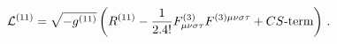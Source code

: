\begin{equation}
   \label{Mth}
  {\cal L}^{(11)} =\sqrt{-g^{(11)}}\left(R^{(11)}- {1\over 2  . 4!
}F^{(3)}_{\mu\nu\sigma\tau}F^{(3)\mu\nu\sigma\tau}+ CS \hbox {-term}\right)\, .
\end{equation} 
